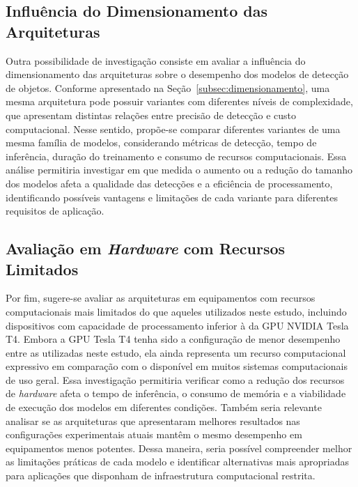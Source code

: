 \subsection{Influência do Dimensionamento das Arquiteturas}
\label{subsec:dimensionamento-arquiteturas}

Outra possibilidade de investigação consiste em avaliar a influência do dimensionamento das
arquiteturas sobre o desempenho dos modelos de detecção de objetos. Conforme apresentado na
Seção~\ref{subsec:dimensionamento}, uma mesma arquitetura pode possuir variantes com
diferentes níveis de complexidade, que apresentam distintas relações entre precisão de
detecção e custo computacional. Nesse sentido, propõe-se comparar diferentes variantes de
uma mesma família de modelos, considerando métricas de detecção, tempo de inferência,
duração do treinamento e consumo de recursos computacionais. Essa análise permitiria
investigar em que medida o aumento ou a redução do tamanho dos modelos afeta a qualidade
das detecções e a eficiência de processamento, identificando possíveis vantagens e
limitações de cada variante para diferentes requisitos de aplicação.

\subsection[Avaliação em Hardware com Recursos Limitados]{Avaliação em \textit{Hardware} com Recursos Limitados}
\label{subsec:hardware-limitado}

Por fim, sugere-se avaliar as arquiteturas em equipamentos com recursos computacionais mais
limitados do que aqueles utilizados neste estudo, incluindo dispositivos com capacidade de
processamento inferior à da GPU NVIDIA Tesla T4. Embora a GPU Tesla T4 tenha sido a configuração 
de menor desempenho entre as utilizadas neste estudo, ela ainda representa um recurso computacional 
expressivo em comparação com o disponível em muitos sistemas computacionais de uso geral. 
Essa investigação permitiria verificar como a redução dos recursos de \textit{hardware} afeta o 
tempo de inferência, o consumo de memória e a viabilidade de execução dos modelos em diferentes condições. 
Também seria relevante analisar se as arquiteturas que apresentaram melhores resultados nas configurações
experimentais atuais mantêm o mesmo desempenho em equipamentos menos potentes. Dessa maneira, seria 
possível compreender melhor as limitações práticas de cada modelo e identificar alternativas mais 
apropriadas para aplicações que disponham de infraestrutura computacional restrita.

